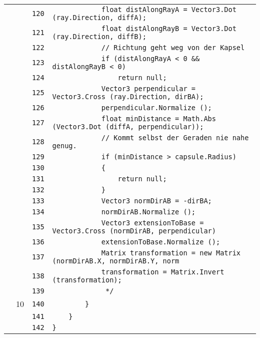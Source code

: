 \documentclass[a4paper,10pt]{article}
\begin{document}
\begin{longtable}[l]{lrrl}
\cellcolor{gray} &  & \verb~120~ & \verb~            float distAlongRayA = Vector3.Dot (ray.Direction, diffA);~\\
\cellcolor{gray} &  & \verb~121~ & \verb~            float distAlongRayB = Vector3.Dot (ray.Direction, diffB);~\\
\cellcolor{gray} &  & \verb~122~ & \verb~            // Richtung geht weg von der Kapsel~\\
\cellcolor{gray} &  & \verb~123~ & \verb~            if (distAlongRayA < 0 && distAlongRayB < 0)~\\
\cellcolor{gray} &  & \verb~124~ & \verb~                return null;~\\
\cellcolor{gray} &  & \verb~125~ & \verb~            Vector3 perpendicular = Vector3.Cross (ray.Direction, dirBA);~\\
\cellcolor{gray} &  & \verb~126~ & \verb~            perpendicular.Normalize ();~\\
\cellcolor{gray} &  & \verb~127~ & \verb~            float minDistance = Math.Abs (Vector3.Dot (diffA, perpendicular));~\\
\cellcolor{gray} &  & \verb~128~ & \verb~            // Kommt selbst der Geraden nie nahe genug.~\\
\cellcolor{gray} &  & \verb~129~ & \verb~            if (minDistance > capsule.Radius)~\\
\cellcolor{gray} &  & \verb~130~ & \verb~            {~\\
\cellcolor{gray} &  & \verb~131~ & \verb~                return null;~\\
\cellcolor{gray} &  & \verb~132~ & \verb~            }~\\
\cellcolor{gray} &  & \verb~133~ & \verb~            Vector3 normDirAB = -dirBA;~\\
\cellcolor{gray} &  & \verb~134~ & \verb~            normDirAB.Normalize ();~\\
\cellcolor{gray} &  & \verb~135~ & \verb~            Vector3 extensionToBase = Vector3.Cross (normDirAB, perpendicular)~\\
\cellcolor{gray} &  & \verb~136~ & \verb~            extensionToBase.Normalize ();~\\
\cellcolor{gray} &  & \verb~137~ & \verb~            Matrix transformation = new Matrix (normDirAB.X, normDirAB.Y, norm~\\
\cellcolor{gray} &  & \verb~138~ & \verb~            transformation = Matrix.Invert (transformation);~\\
\cellcolor{gray} &  & \verb~139~ & \verb~             */~\\
\cellcolor{green} & 10 & \verb~140~ & \verb~        }~\\
\cellcolor{gray} &  & \verb~141~ & \verb~    }~\\
\cellcolor{gray} &  & \verb~142~ & \verb~}~\\
\end{longtable}
\newpage
\end{document}
